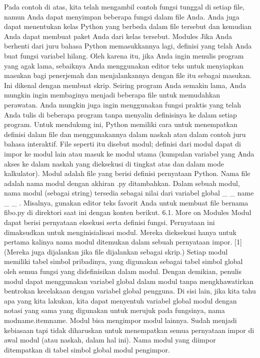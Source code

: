 Pada contoh di atas, kita telah mengambil contoh fungsi tunggal di setiap file, namun Anda dapat menyimpan beberapa fungsi dalam file Anda. Anda juga dapat menentukan kelas Python yang berbeda dalam file tersebut dan kemudian Anda dapat membuat paket Anda dari kelas tersebut.
Modules  
Jika Anda berhenti dari juru bahasa Python  memasukkannya lagi, definisi yang telah Anda buat fungsi  variabel hilang. Oleh karena itu, jika Anda ingin menulis program yang agak lama, sebaiknya Anda menggunakan editor teks untuk menyiapkan masukan bagi penerjemah dan menjalankannya dengan file itu sebagai masukan. Ini dikenal dengan membuat skrip. Seiring program Anda semakin lama, Anda mungkin ingin membaginya menjadi beberapa file untuk memudahkan perawatan. Anda mungkin juga ingin menggunakan fungsi praktis yang telah Anda tulis di beberapa program tanpa menyalin definisinya ke dalam setiap program.  
Untuk mendukung ini, Python memiliki cara untuk menempatkan definisi dalam file dan menggunakannya dalam naskah atau dalam contoh juru bahasa interaktif. File seperti itu disebut modul; definisi dari modul dapat di impor ke modul lain atau masuk ke modul utama (kumpulan variabel yang Anda akses ke dalam naskah yang dieksekusi di tingkat atas dan dalam mode kalkulator).  
Modul adalah file yang berisi definisi  pernyataan Python. Nama file adalah nama modul dengan akhiran .py ditambahkan. Dalam sebuah modul, nama modul (sebagai string) tersedia sebagai nilai dari variabel global    \_     \_  name   \_     \_  . Misalnya, gunakan editor teks favorit Anda untuk membuat file bernama fibo.py di direktori saat ini dengan konten berikut.  
6.1. More on Modules 
Modul dapat berisi pernyataan eksekusi serta definisi fungsi. Pernyataan ini dimaksudkan untuk menginisialisasi modul. Mereka dieksekusi hanya untuk pertama kalinya nama modul ditemukan dalam sebuah pernyataan impor. [1] (Mereka juga dijalankan jika file dijalankan sebagai skrip.)  
Setiap modul memiliki tabel simbol pribadinya, yang digunakan sebagai tabel simbol global oleh semua fungsi yang didefinisikan dalam modul. Dengan demikian, penulis modul dapat menggunakan variabel global dalam modul tanpa mengkhawatirkan bentrokan kecelakaan dengan variabel global pengguna. Di sisi lain, jika kita tahu apa yang kita lakukan, kita dapat menyentuh variabel global modul dengan notasi yang sama yang digunakan untuk merujuk pada fungsinya, nama modname.itemname. 
Modul bisa mengimpor modul lainnya. Sudah menjadi kebiasaan tapi tidak diharuskan untuk menempatkan semua pernyataan impor di awal modul (atau naskah, dalam hal ini). Nama modul yang diimpor ditempatkan di tabel simbol global modul pengimpor.  
